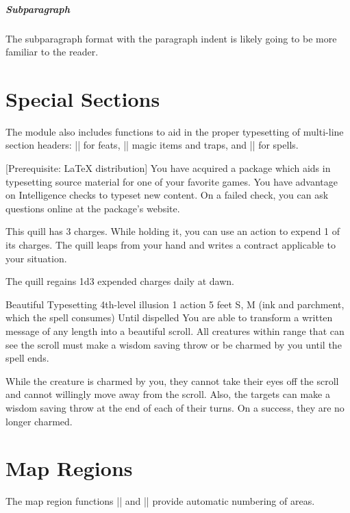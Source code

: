 \documentclass[letterpaper,twocolumn,openany,nodeprecatedcode]{dndbook}
\begin{document}
\subparagraph{Subparagraph}
The subparagraph format with the paragraph indent is likely going to be more familiar to the reader.

\section{Special Sections}
The module also includes functions to aid in the proper typesetting of multi-line section headers: |\DndFeatHeader| for feats, |\DndItemHeader| magic items and traps, and |\DndSpellHeader| for spells.

[Prerequisite: \LaTeX{} distribution]
You have acquired a package which aids in typesetting source material for one of your favorite games. You have advantage on Intelligence checks to typeset new content. On a failed check, you can ask questions online at the package's website.

This quill has 3 charges. While holding it, you can use an action to expend 1 of its charges. The quill leaps from your hand and writes a contract applicable to your situation.

The quill regains 1d3 expended charges daily at dawn.

\DndSpellHeader%
  {Beautiful Typesetting}
  {4th-level illusion}
  {1 action}
  {5 feet}
  {S, M (ink and parchment, which the spell consumes)}
  {Until dispelled}
You are able to transform a written message of any length into a beautiful scroll. All creatures within range that can see the scroll must make a wisdom saving throw or be charmed by you until the spell ends.

While the creature is charmed by you, they cannot take their eyes off the scroll and cannot willingly move away from the scroll. Also, the targets can make a wisdom saving throw at the end of each of their turns. On a success, they are no longer charmed.


\lipsum[3-10]

\section{Map Regions}
The map region functions |\DndArea| and |\DndSubArea| provide automatic numbering of areas.
\end{document}
